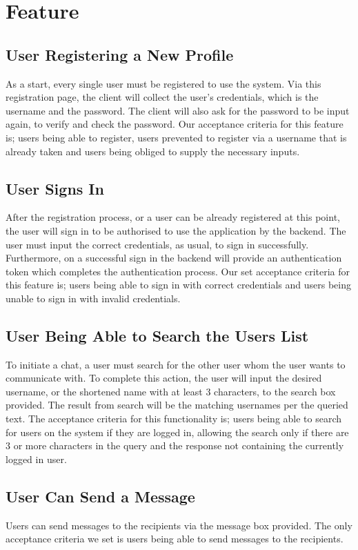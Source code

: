 \documentclass[11pt,a4paper]{report}
\begin{document}
\section{Feature}
\subsection{User Registering a New Profile}
As a start, every single user must be registered to use the system. Via this registration page, the client will collect the user’s credentials, which is the username and the password. The client will also ask for the password to be input again, to verify and check the password. Our acceptance criteria for this feature is; users being able to register, users prevented to register via a username that is already taken and users being obliged to supply the necessary inputs.
\subsection{User Signs In}
After the registration process, or a user can be already registered at this point, the user will sign in to be authorised to use the application by the backend. The user must input the correct credentials, as usual, to sign in successfully. Furthermore, on a successful sign in the backend will provide an authentication token which completes the authentication process. Our set acceptance criteria for this feature is; users being able to sign in with correct credentials and users being unable to sign in with invalid credentials.
\subsection{User Being Able to Search the Users List}
To initiate a chat, a user must search for the other user whom the user wants to communicate with. To complete this action, the user will input the desired username, or the shortened name with at least 3 characters, to the search box provided. The result from search will be the matching usernames per the queried text. The acceptance criteria for this functionality is; users being able to search for users on the system if they are logged in, allowing the search only if there are 3 or more characters in the query and the response not containing the currently logged in user.
\subsection{User Can Send a Message}
Users can send messages to the recipients via the message box provided. The only acceptance criteria we set is users being able to send messages to the recipients.
\end{document}
